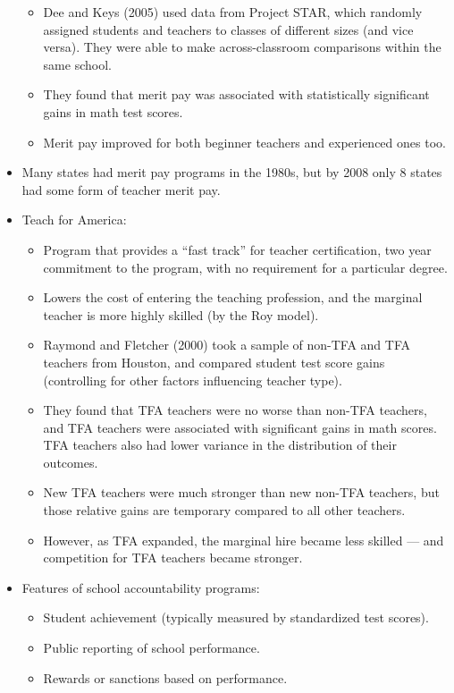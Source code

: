 \documentclass[10pt]{extarticle}
\begin{document}
\begin{itemize}
\begin{itemize}
        \item Dee and Keys (2005) used data from Project STAR, which randomly assigned students and teachers to classes of different sizes (and vice versa). They were able to make across-classroom comparisons within the same school.
        \item They found that merit pay was associated with statistically significant gains in math test scores.
        \item Merit pay improved for both beginner teachers and experienced ones too.
      \end{itemize}
    \item Many states had merit pay programs in the 1980s, but by 2008 only 8 states had some form of teacher merit pay.
    \item Teach for America:
      \begin{itemize}
        \item Program that provides a ``fast track'' for teacher certification, two year commitment to the program, with no requirement for a particular degree.
        \item Lowers the cost of entering the teaching profession, and the marginal teacher is more highly skilled (by the Roy model).
        \item Raymond and Fletcher (2000) took a sample of non-TFA and TFA teachers from Houston, and compared student test score gains (controlling for other factors influencing teacher type).
        \item They found that TFA teachers were no worse than non-TFA teachers, and TFA teachers were associated with significant gains in math scores. TFA teachers also had lower variance in the distribution of their outcomes.
        \item New TFA teachers were much stronger than new non-TFA teachers, but those relative gains are temporary compared to all other teachers.
        \item However, as TFA expanded, the marginal hire became less skilled --- and competition for TFA teachers became stronger.
      \end{itemize}
    \item Features of school accountability programs:
      \begin{itemize}
        \item Student achievement (typically measured by standardized test scores).
        \item Public reporting of school performance.
        \item Rewards or sanctions based on performance.

\end{itemize}
\end{itemize}
\end{document}
